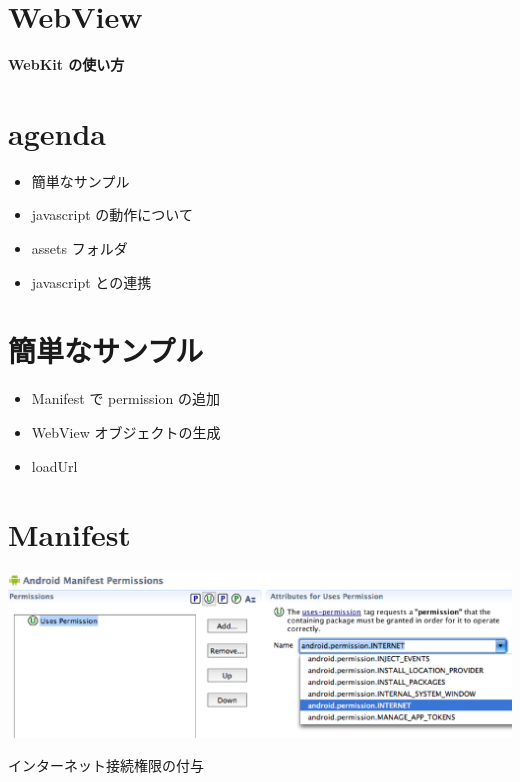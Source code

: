 \documentclass[slide,papersize]{jsarticle}
\begin{document}
\section*{WebView}
\vspace*{15mm}
\begin{center}
{\Huge {\bf WebKit の使い方}}
\end{center}

\section*{agenda}
\bigskip
\begin{itemize}
\item 簡単なサンプル
\bigskip
\item javascript の動作について
\bigskip
\item assets フォルダ
\bigskip
\item javascript との連携
\end{itemize}

\section*{簡単なサンプル}
\bigskip
\begin{itemize}
\item Manifest で permission の追加
\bigskip
\item WebView オブジェクトの生成
\bigskip
\item loadUrl
\end{itemize}

\section*{Manifest}
\begin{center}
\includegraphics[scale=0.25]{internet-permission.eps}
\end{center}
インターネット接続権限の付与
\end{document}
